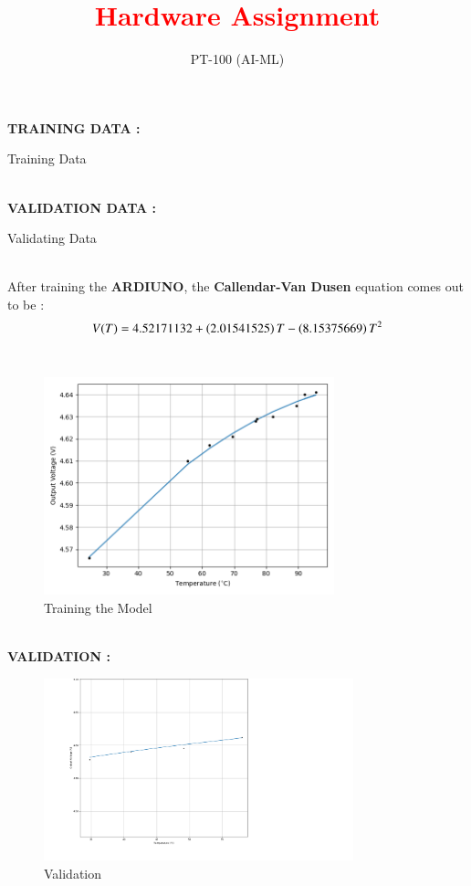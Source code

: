 \documentclass[journal]{IEEEtran}
\begin{document}

\vspace{3cm}

\title{\textbf{\textcolor{red}{Hardware Assignment}}}

\author{PT-100 (AI-ML)}
\date{}


{\let\newpage\relax\maketitle}
\textbf{TRAINING DATA :}
\begin{table}[h]    	
    \centering
     
    \caption{Training Data}
    \label{tab:1-1.9-6}
\end{table}
\\
\textbf{VALIDATION DATA :}
\begin{table}[h]
	\centering
	
	\caption{Validating Data}
	\label{tab:2-1.9-7}
\end{table}
\\
After training the \textbf{ARDIUNO}, the \textbf{Callendar-Van Dusen} equation comes out to be : \\
\begin{align}
	V(T) = 4.52171132 + \left(2.01541525\right) T -\left(8.15375669\right) T^2
\end{align}
\\
\begin{figure}[h]
	\centering
	\includegraphics[width=0.75\textwidth]{figs/train.png}
    \caption{Training the Model}
    \label{fig:PT100}  
\end{figure}
\\
\newpage
\textbf{VALIDATION :}
\begin{figure}[ht]  
    \centering
    \includegraphics[width=0.8\textwidth]{figs/valid.png}  
    \caption{Validation}
    \label{fig:Valid}  
\end{figure}
\end{document}
